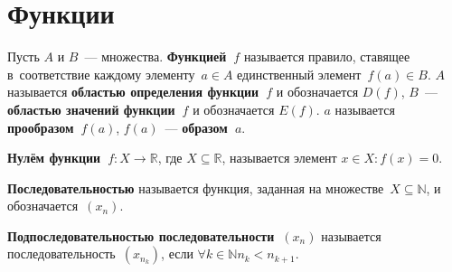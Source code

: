 \section{Функции}
 Пусть $A$ и $B$~--- множества.
\textbf{Функцией~$f$} называется правило, ставящее в~соответствие каждому элементу~$a \in A$ единственный элемент~$f(a) \in B$.
$A$ называется \textbf{областью определения функции~$f$} и обозначается $D(f)$, $B$~--- \textbf{областью значений функции~$f$} и обозначается $E(f)$.
$a$ называется \textbf{прообразом~$f(a)$}, $f(a)$~--- \textbf{образом~$a$}.

\textbf{Нулём функции~$f \colon X \to \mathbb R$}, где $X \subseteq \mathbb R$, называется элемент $x \in X \colon f(x) = 0$.

 \textbf{Последовательностью} называется функция, заданная на множестве~$X \subseteq \mathbb N$, и обозначается~$(x_n)$.

\textbf{Подпоследовательностью последовательности~$(x_n)$} называется последовательность~$(x_{n_k})$, если $\forall k \in \mathbb N \allowbreak n_k < n_{k+1}$.